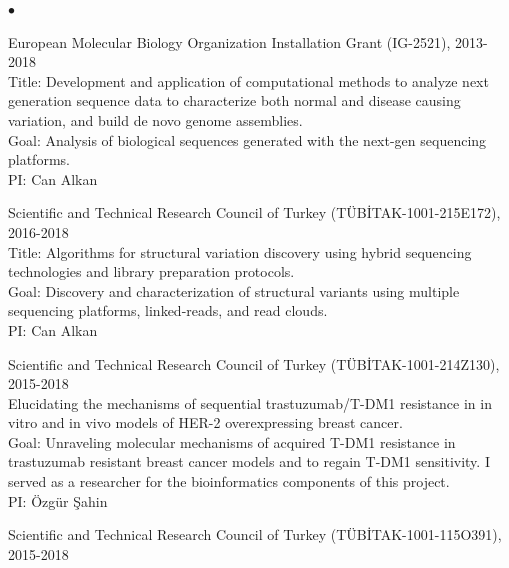 \documentclass[margin,line]{res}
\newenvironment{list2}{
  \begin{list}{$\bullet$}{%
      \setlength{\itemsep}{0.1cm}
      \setlength{\parsep}{0in} \setlength{\parskip}{0in}
      \setlength{\topsep}{0in} \setlength{\partopsep}{0in} 
      \setlength{\leftmargin}{0.2in}}}{\end{list}}
\begin{document}
\begin{resume}
\begin{list2}
                                       
                                     \item
                                         European Molecular Biology Organization Installation Grant (IG-2521), 2013-2018 \\
                                         Title: Development and application of computational methods to analyze next generation sequence data to characterize both normal and disease causing variation, and build de novo genome assemblies.\\
                                         Goal: Analysis of biological sequences generated with the next-gen sequencing platforms.\\
                                         PI: Can Alkan
                                       \item
                                         Scientific and Technical Research Council of Turkey (T\"{U}B\.{I}TAK-1001-215E172), 2016-2018\\
                                         Title: Algorithms for structural variation discovery using hybrid sequencing technologies and library preparation protocols.\\
                                         Goal: Discovery and characterization of structural variants using multiple sequencing platforms, linked-reads, and read clouds.\\
                                         PI: Can Alkan
                                         \item
                                         Scientific and Technical Research Council of Turkey (T\"{U}B\.{I}TAK-1001-214Z130), 2015-2018\\
                                         Elucidating the mechanisms of sequential trastuzumab/T-DM1 resistance in in vitro and in vivo models of HER-2
                                         overexpressing breast cancer.\\
                                         Goal: Unraveling molecular mechanisms of acquired T-DM1 resistance in trastuzumab resistant breast 
                                         cancer models and to regain T-DM1 sensitivity. I served as a researcher 
                                         for the bioinformatics components of this project.\\
                                         PI: Özgür Şahin
                                       \item
                                         Scientific and Technical Research Council of Turkey (T\"{U}B\.{I}TAK-1001-115O391), 2015-2018\\

\end{list2}
\end{resume}
\end{document}
